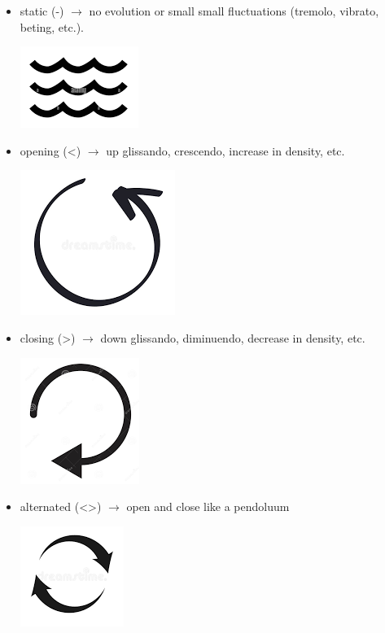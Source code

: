 \begin{itemize}
  \begin{itemize}
  \item static (-) \(\rightarrow\) no evolution or small small fluctuations (tremolo, vibrato, beting, etc.).
    \begin{center}
    \includegraphics[scale=0.2]{../img/static.png}
    \end{center}
  \item opening (\textless) \(\rightarrow\) up glissando, crescendo, increase in density, etc.
    \begin{center}
    \includegraphics[scale=0.1]{../img/open.png}
    \end{center}
  \item closing (\textgreater) \(\rightarrow\) down glissando, diminuendo, decrease in density, etc.
    \begin{center}
    \includegraphics[scale=0.15]{../img/close.png}
    \end{center}
  \item alternated (\textless\textgreater) \(\rightarrow\) open and close like a pendoluum
    \begin{center}
    \includegraphics[scale=0.22]{../img/alternate.png}

\end{center}
\end{itemize}
\end{itemize}
